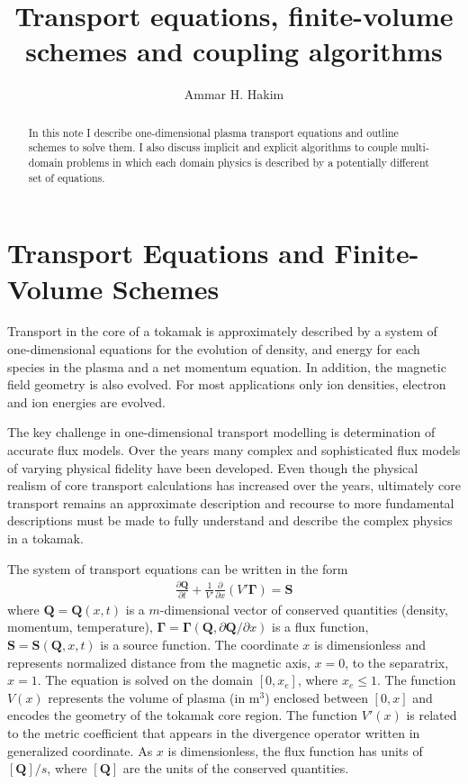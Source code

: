 \documentclass[reqno]{amsart}
\title{Transport equations, finite-volume schemes and coupling
  algorithms}%
\author{Ammar H. Hakim}%
\date{}
\newcommand{\pfrac}[2]{\frac{\partial #1}{\partial #2}}
\newcommand{\pfraca}[1]{\frac{\partial}{\partial #1}}
\newcommand{\pfracb}[2]{\partial #1/\partial #2}
\newcommand{\mvec}[1]{\mathbf{#1}}
\newcommand{\gvec}[1]{\boldsymbol{#1}}
\theoremstyle{definition}
\begin{document}
\maketitle

\begin{abstract}
  In this note I describe one-dimensional plasma transport equations
  and outline schemes to solve them. I also discuss implicit and
  explicit algorithms to couple multi-domain problems in which each
  domain physics is described by a potentially different set of
  equations.
\end{abstract}

\section{Transport Equations and Finite-Volume Schemes}

Transport in the core of a tokamak is approximately described by a
system of one-dimensional equations for the evolution of density, and
energy for each species in the plasma and a net momentum equation. In
addition, the magnetic field geometry is also evolved. For most
applications only ion densities, electron and ion energies are
evolved.

The key challenge in one-dimensional transport modelling is
determination of accurate flux models. Over the years many complex and
sophisticated flux models of varying physical fidelity have been
developed. Even though the physical realism of core transport
calculations has increased over the years, ultimately core transport
remains an approximate description and recourse to more fundamental
descriptions must be made to fully understand and describe the complex
physics in a tokamak.

The system of transport equations can be written in the form
\begin{align}
  \pfrac{\mvec{Q}}{t} 
  + \frac{1}{V'} \pfraca{x} \left( V' \gvec{\Gamma} \right) = \mvec{S}
  \label{eq:transport}
\end{align}
where $\mvec{Q} = \mvec{Q}(x,t)$ is a $m$-dimensional vector of
conserved quantities (density, momentum, temperature), $\gvec{\Gamma}
= \gvec{\Gamma}(\mvec{Q},\pfracb{\mvec{Q}}{x})$ is a flux function,
$\mvec{S} = \mvec{S}(\mvec{Q},x,t)$ is a source function. The
coordinate $x$ is dimensionless and represents normalized distance
from the magnetic axis, $x=0$, to the separatrix, $x=1$. The equation
is solved on the domain $[0,x_e]$, where $x_e \le 1$. The function
$V(x)$ represents the volume of plasma (in m$^3$) enclosed between
$[0,x]$ and encodes the geometry of the tokamak core region. The
function $V'(x)$ is related to the metric coefficient that appears in
the divergence operator written in generalized coordinate. As $x$ is
dimensionless, the flux function has units of $[\mvec{Q}]/s$, where
$[\mvec{Q}]$ are the units of the conserved quantities.
\end{document}
